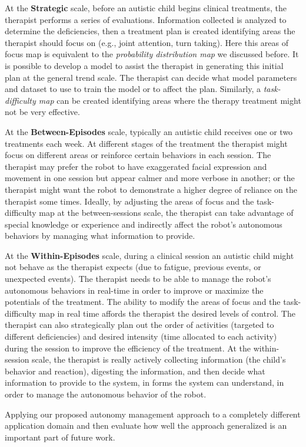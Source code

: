 At the \textbf{Strategic} scale, before an autistic child begins clinical treatments, the therapist performs a series of evaluations. Information collected is analyzed to determine the deficiencies, then a treatment plan is created identifying areas the therapist should focus on (e.g., joint attention, turn taking). Here this areas of focus map is equivalent to the \textit{probability distribution map} we discussed before. It is possible to develop a model to assist the therapist in generating this initial plan at the general trend scale. The therapist can decide what model parameters and dataset to use to train the model or to affect the plan. Similarly, a \textit{task-difficulty map} can be created identifying areas where the therapy treatment might not be very effective.

At the \textbf{Between-Episodes} scale, typically an autistic child receives one or two treatments each week. At different stages of the treatment the therapist might focus on different areas or reinforce certain behaviors in each session. The therapist may prefer the robot to have exaggerated facial expression and movement in one session but appear calmer and more verbose in another; or the therapist might want the robot to demonstrate a higher degree of reliance on the therapist some times. Ideally, by adjusting the areas of focus and the task-difficulty map at the between-sessions scale, the therapist can take advantage of special knowledge or experience and indirectly affect the robot's autonomous behaviors by managing what information to provide.

At the \textbf{Within-Episodes} scale, during a clinical session an autistic child might not behave as the therapist expects (due to fatigue, previous events, or unexpected events). The therapist needs to be able to manage the robot's autonomous behaviors in real-time in order to improve or maximize the potentials of the treatment. The ability to modify the areas of focus and the task-difficulty map in real time affords the therapist the desired levels of control. The therapist can also strategically plan out the order of activities (targeted to different deficiencies) and desired intensity (time allocated to each activity) during the session to improve the efficiency of the treatment. At the within-session scale, the therapist is really actively collecting information (the child's behavior and reaction), digesting the information, and then decide what information to provide to the system, in forms the system can understand, in order to manage the autonomous behavior of the robot.

Applying our proposed autonomy management approach to a completely different application domain and then evaluate how well the approach generalized is an important part of future work.